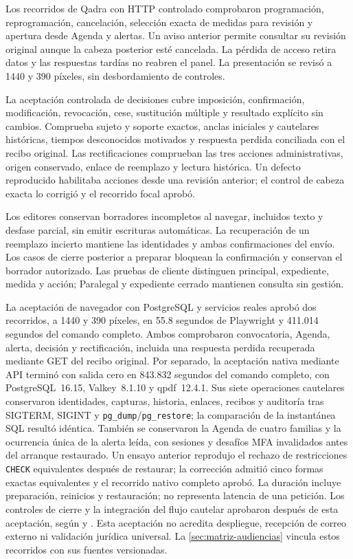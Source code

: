 Los recorridos de Qadra con HTTP controlado comprobaron programaci\'on, reprogramaci\'on, cancelaci\'on, selecci\'on exacta de medidas para revisi\'on y apertura desde Agenda y alertas. Un aviso anterior permite consultar su revisi\'on original aunque la cabeza posterior est\'e cancelada. La p\'erdida de acceso retira datos y las respuestas tard\'ias no reabren el panel. La presentaci\'on se revis\'o a 1440 y 390 p\'ixeles, sin desbordamiento de controles.

La aceptaci\'on controlada de decisiones cubre imposici\'on, confirmaci\'on, modificaci\'on, revocaci\'on, cese, sustituci\'on m\'ultiple y resultado expl\'icito sin cambios. Comprueba sujeto y soporte exactos, anclas iniciales y cautelares hist\'oricas, tiempos desconocidos motivados y respuesta perdida conciliada con el recibo original. Las rectificaciones comprueban las tres acciones administrativas, origen conservado, enlace de reemplazo y lectura hist\'orica. Un defecto reproducido habilitaba acciones desde una revisi\'on anterior; el control de cabeza exacta lo corrigi\'o y el recorrido focal aprob\'o.

Los editores conservan borradores incompletos al navegar, incluidos texto y desfase parcial, sin emitir escrituras autom\'aticas. La recuperaci\'on de un reemplazo incierto mantiene las identidades y ambas confirmaciones del env\'io. Los casos de cierre posterior a preparar bloquean la confirmaci\'on y conservan el borrador autorizado. Las pruebas de cliente distinguen principal, expediente, medida y acci\'on; Paralegal y expediente cerrado mantienen consulta sin gesti\'on.

La aceptaci\'on de navegador con PostgreSQL y servicios reales aprob\'o dos recorridos, a 1440 y 390 p\'ixeles, en 55.8 segundos de Playwright y 411.014 segundos del comando completo. Ambos comprobaron convocatoria, Agenda, alerta, decisi\'on y rectificaci\'on, incluida una respuesta perdida recuperada mediante GET del recibo original. Por separado, la aceptaci\'on nativa mediante API termin\'o con salida cero en 843.832 segundos del comando completo, con PostgreSQL~16.15, Valkey~8.1.10 y qpdf~12.4.1. Sus siete operaciones cautelares conservaron identidades, capturas, historia, enlaces, recibos y auditor\'ia tras SIGTERM, SIGINT y \texttt{pg\_dump}/\texttt{pg\_restore}; la comparaci\'on de la instant\'anea SQL result\'o id\'entica. Tambi\'en se conservaron la Agenda de cuatro familias y la ocurrencia \'unica de la alerta le\'ida, con sesiones y desaf\'ios MFA invalidados antes del arranque restaurado. Un ensayo anterior reprodujo el rechazo de restricciones \texttt{CHECK} equivalentes despu\'es de restaurar; la correcci\'on admiti\'o cinco formas exactas equivalentes y el recorrido nativo completo aprob\'o. La duraci\'on incluye preparaci\'on, reinicios y restauraci\'on; no representa latencia de una petici\'on. Los controles de cierre y la integraci\'on del flujo cautelar aprobaron despu\'es de esta aceptaci\'on, seg\'un  y . Esta aceptaci\'on no acredita despliegue, recepci\'on de correo externo ni validaci\'on jur\'idica universal. La \cref{sec:matriz-audiencias} vincula estos recorridos con sus fuentes versionadas.
